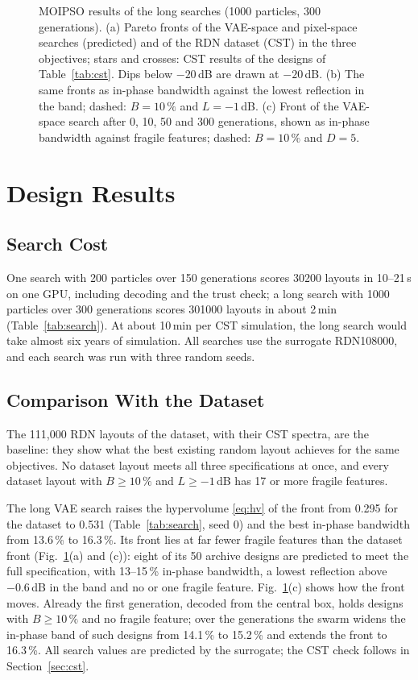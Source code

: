 \begin{figure}[!t]
\centering
{}
\caption{MOIPSO results of the long searches (1000 particles, 300 generations). (a) Pareto fronts of the VAE-space and pixel-space searches (predicted) and of the RDN dataset (CST) in the three objectives; stars and crosses: CST results of the designs of Table~\ref{tab:cst}. Dips below $-20$\,dB are drawn at $-20$\,dB. (b) The same fronts as in-phase bandwidth against the lowest reflection in the band; dashed: $B=10\,\%$ and $L=-1$\,dB. (c) Front of the VAE-space search after 0, 10, 50 and 300 generations, shown as in-phase bandwidth against fragile features; dashed: $B=10\,\%$ and $D=5$.}
\label{fig:pareto}
\end{figure}

\section{Design Results}\label{sec:invresults}

\subsection{Search Cost}
One search with 200 particles over 150 generations scores \num{30200} layouts in 10--21\,s on one GPU, including decoding and the trust check; a long search with 1000 particles over 300 generations scores \num{301000} layouts in about 2\,min (Table~\ref{tab:search}). At about 10\,min per CST simulation, the long search would take almost six years of simulation. All searches use the surrogate RDN108000, and each search was run with three random seeds.

\subsection{Comparison With the Dataset}
The 111,000 RDN layouts of the dataset, with their CST spectra, are the baseline: they show what the best existing random layout achieves for the same objectives. No dataset layout meets all three specifications at once, and every dataset layout with $B\geq10\,\%$ and $L\geq-1$\,dB has 17 or more fragile features.

The long VAE search raises the hypervolume \eqref{eq:hv} of the front from 0.295 for the dataset to 0.531 (Table~\ref{tab:search}, seed 0) and the best in-phase bandwidth from 13.6\,\% to 16.3\,\%. Its front lies at far fewer fragile features than the dataset front (Fig.~\ref{fig:pareto}(a) and (c)): eight of its 50 archive designs are predicted to meet the full specification, with 13--15\,\% in-phase bandwidth, a lowest reflection above $-0.6$\,dB in the band and no or one fragile feature. Fig.~\ref{fig:pareto}(c) shows how the front moves. Already the first generation, decoded from the central box, holds designs with $B\geq10\,\%$ and no fragile feature; over the generations the swarm widens the in-phase band of such designs from 14.1\,\% to 15.2\,\% and extends the front to 16.3\,\%. All search values are predicted by the surrogate; the CST check follows in Section~\ref{sec:cst}.

